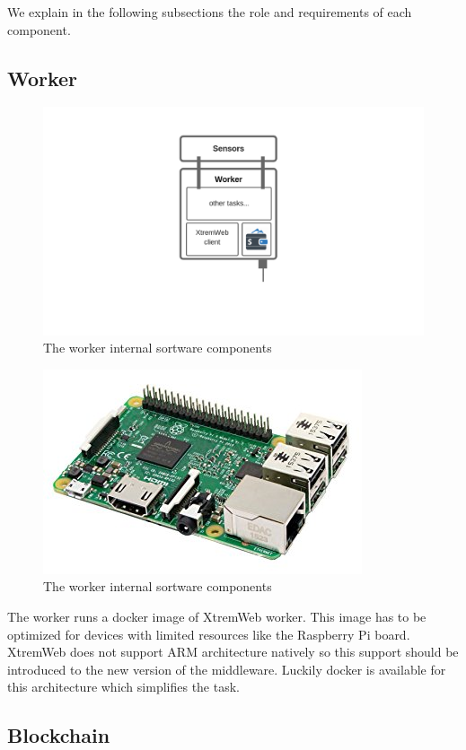     We explain in the following subsections the role and requirements of each
    component.

    \subsection{Worker}

        \begin{figure}[!h]\centering
            \includegraphics[width=.9\columnwidth]{5-Design/figs/worker.png}
            \caption{The worker internal sortware components}
        \end{figure}

        \begin{figure}[!h]\centering
            \includegraphics[width=.4\columnwidth]{5-Design/figs/raspberry.jpg}
            \caption{The worker internal sortware components}
        \end{figure}

        The worker runs a docker image of XtremWeb worker. This image has to be optimized for devices with
        limited resources like the Raspberry Pi board.
        XtremWeb does not support ARM architecture natively so this support should be introduced
        to the new version of the middleware. Luckily docker is available for this architecture which simplifies
        the task.

    \subsection{Blockchain}
    
